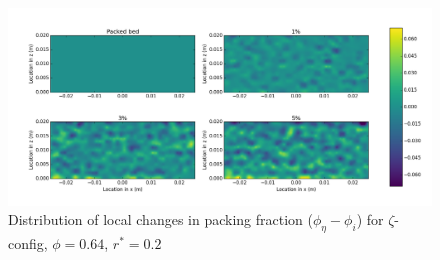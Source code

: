 \documentclass[11pt]{report} %
\begin{document}
\begin{figure}[!t]
    \centering
    \includegraphics[width = \textwidth]{images/z-62-r125-1-deltas.png}
    \caption{Distribution of local changes in packing fraction ($\phi_{\eta} - \phi_i$) for $\zeta$-config, $\phi = 0.64$, $r^* = 0.2$}\label{fig:z-624-r125-deltas}
\end{figure}




\end{document}
